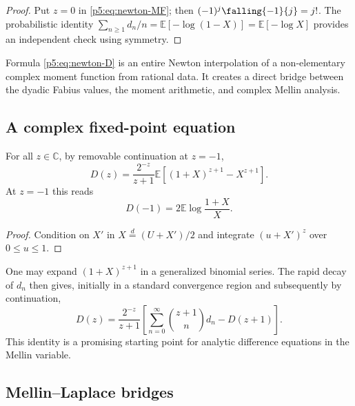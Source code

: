 \documentclass[11pt,oneside]{article}
\theoremstyle{definition}
\theoremstyle{remark}
\newcommand{\E}{\mathbb E}
\newcommand{\C}{\mathbb C}
\newcommand{\1}{\mathbf 1}
\begin{document}
\begin{proof}
Put $z=0$ in \eqref{p5:eq:newton-MF}; then
$(-1)^j\falling{-1}{j}=j!$.  The probabilistic identity
$\sum_{n\ge1}d_n/n=\E[-\log(1-X)]=\E[-\log X]$
provides an independent check using symmetry.
\end{proof}

\newresultPartii Formula \eqref{p5:eq:newton-D} is an entire Newton interpolation of a non-elementary complex moment function from rational data.  It creates a direct bridge between the dyadic Fabius values, the moment arithmetic, and complex Mellin analysis.

\subsection{A complex fixed-point equation}

\begin{proposition}\label{p5:prop:D-fixed-point}
For all $z\in\C$, by removable continuation at $z=-1$,
\begin{equation}\label{p5:eq:D-fixed-point}
 D(z)=\frac{2^{-z}}{z+1}
 \E\left[(1+X)^{z+1}-X^{z+1}\right].
\end{equation}
At $z=-1$ this reads
\begin{equation}
 D(-1)=2\E\log\frac{1+X}{X}.
\end{equation}
\end{proposition}

\begin{proof}
Condition on $X'$ in $X\overset d=(U+X')/2$ and integrate $(u+X')^z$ over $0\le u\le1$.
\end{proof}

One may expand $(1+X)^{z+1}$ in a generalized binomial series.  The rapid decay of $d_n$ then gives, initially in a standard convergence region and subsequently by continuation,
\begin{equation}\label{p5:eq:D-binomial-functional}
 D(z)=\frac{2^{-z}}{z+1}
 \left[\sum_{n=0}^{\infty}\binom{z+1}{n}d_n-D(z+1)\right].
\end{equation}
This identity is a promising starting point for analytic difference equations in the Mellin variable.

\subsection{Mellin--Laplace bridges}
\end{document}
